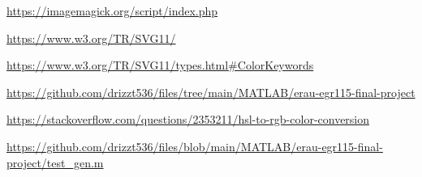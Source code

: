 \documentclass[12pt]{article}
\begin{document}
\begin{enumerate}[label={[1]}]
	\item \url{https://imagemagick.org/script/index.php}
	\label{imagemagick}
\end{enumerate}
\vspace{-2em}
\begin{enumerate}[label={[2]}]
	\item \url{https://www.w3.org/TR/SVG11/}
	\label{svg docs}
\end{enumerate}
\vspace{-2em}
\begin{enumerate}[label={[3]}]
	\item \url{https://www.w3.org/TR/SVG11/types.html#ColorKeywords}
	\label{svg named colors}
\end{enumerate}
\vspace{-2em}
\begin{enumerate}[label={[4]}]
	\item \url{https://github.com/drizzt536/files/tree/main/MATLAB/erau-egr115-final-project}
	\label{code folder}
\end{enumerate}
\vspace{-2em}
\begin{enumerate}[label={[5]}]
	\item \url{https://stackoverflow.com/questions/2353211/hsl-to-rgb-color-conversion}
	\label{hsl2rgb}
\end{enumerate}
\vspace{-2em}
\begin{enumerate}[label={[6]}]
	\item \url{https://github.com/drizzt536/files/blob/main/MATLAB/erau-egr115-final-project/test_gen.m}
	\label{test suite}
\end{enumerate}
\end{document}
